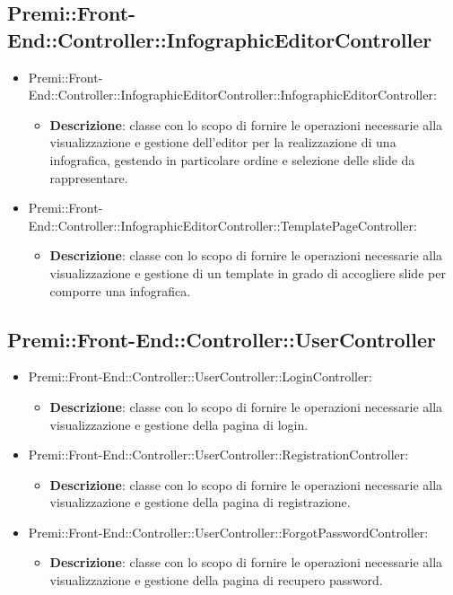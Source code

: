 \subsection{Premi::Front-End::Controller::InfographicEditorController}
	\begin{itemize}
		 \item Premi::Front-End::Controller::InfographicEditorController::InfographicEditorController:
			\begin{itemize}
				\item \textbf{Descrizione}: classe con lo scopo di fornire le operazioni necessarie alla visualizzazione e gestione dell'editor per la realizzazione di una infografica, gestendo in particolare ordine e selezione delle slide da rappresentare.
			\end{itemize}
		\item  Premi::Front-End::Controller::InfographicEditorController::TemplatePageController: 
			 \begin{itemize}
				\item \textbf{Descrizione}: classe con lo scopo di fornire le operazioni necessarie alla visualizzazione e gestione di un template in grado di accogliere slide per comporre una infografica.
			\end{itemize}
	\end{itemize}
	
\subsection{Premi::Front-End::Controller::UserController}
	\begin{itemize}
		\item  Premi::Front-End::Controller::UserController::LoginController: 
			 \begin{itemize}
				\item \textbf{Descrizione}: classe con lo scopo di fornire le operazioni necessarie alla visualizzazione e gestione della pagina di login.
			\end{itemize}
		 \item Premi::Front-End::Controller::UserController::RegistrationController:
			\begin{itemize}
				\item \textbf{Descrizione}: classe con lo scopo di fornire le operazioni necessarie alla visualizzazione e gestione della pagina di registrazione.
			\end{itemize}
		\item  Premi::Front-End::Controller::UserController::ForgotPasswordController: 
			 \begin{itemize}
				\item \textbf{Descrizione}: classe con lo scopo di fornire le operazioni necessarie alla visualizzazione e gestione della pagina di recupero password.
			\end{itemize}
	\end{itemize}